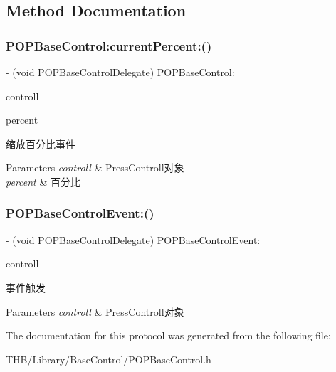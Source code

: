 \subsection{Method Documentation}
\mbox{\label{protocol_p_o_p_base_control_delegate_01-p_ae271901a7e0225fc15eaa9e581939787}} 
\subsubsection{\texorpdfstring{P\+O\+P\+Base\+Control\+:current\+Percent\+:()}{POPBaseControl:currentPercent:()}}
{\footnotesize\ttfamily -\/ (void P\+O\+P\+Base\+Control\+Delegate) P\+O\+P\+Base\+Control\+: \begin{DoxyParamCaption}\item[{(\mbox{\hyperlink{interface_p_o_p_base_control}{P\+O\+P\+Base\+Control}} $\ast$)}]{controll }\item[{currentPercent:(C\+G\+Float)}]{percent }\end{DoxyParamCaption}}

缩放百分比事件


\begin{DoxyParams}{Parameters}
{\em controll} & Press\+Controll对象 \\
\hline
{\em percent} & 百分比 \\
\hline
\end{DoxyParams}
\mbox{\label{protocol_p_o_p_base_control_delegate_01-p_aac58101ed963f321265217f9e32d1f79}} 
\subsubsection{\texorpdfstring{P\+O\+P\+Base\+Control\+Event\+:()}{POPBaseControlEvent:()}}
{\footnotesize\ttfamily -\/ (void P\+O\+P\+Base\+Control\+Delegate) P\+O\+P\+Base\+Control\+Event\+: \begin{DoxyParamCaption}\item[{(\mbox{\hyperlink{interface_p_o_p_base_control}{P\+O\+P\+Base\+Control}} $\ast$)}]{controll }\end{DoxyParamCaption}}

事件触发


\begin{DoxyParams}{Parameters}
{\em controll} & Press\+Controll对象 \\
\hline
\end{DoxyParams}


The documentation for this protocol was generated from the following file\+:\begin{DoxyCompactItemize}
\item 
T\+H\+B/\+Library/\+Base\+Control/P\+O\+P\+Base\+Control.\+h\end{DoxyCompactItemize}
